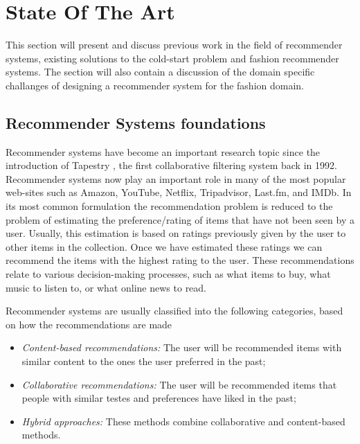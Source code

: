 
\section{State Of The Art}
\label{sec:SotA}

This section will present and discuss previous work in the field of recommender systems, existing solutions to the cold-start problem and fashion recommender systems. The section will also contain a discussion of the domain specific challanges of designing a recommender system for the fashion domain.

\subsection{Recommender Systems foundations}

Recommender systems have become an important research topic since the introduction of Tapestry \cite{Goldberg1992}, the first collaborative filtering system back in 1992. Recommender systems now play an important role in many of the most popular web-sites such as Amazon, YouTube, Netflix, Tripadvisor, Last.fm, and IMDb. In its most common formulation the recommendation problem is reduced to the problem of estimating the preference/rating of items that have not been seen by a user. Usually, this estimation is based on ratings previously given by the user to other items in the collection. Once we have estimated these ratings we can recommend the items with the highest rating to the user. These recommendations relate to various decision-making processes, such as what items to buy, what music to listen to, or what online news to read.

Recommender systems are usually classified into the following categories, based on how the recommendations are made \cite{Adomavicius2005}

\begin{itemize}
\item \emph{Content-based recommendations:} The user will be recommended items with similar content to the ones the user preferred in the past;
\item \emph{Collaborative recommendations:} The user will be recommended items that people with similar testes and preferences have liked in the past;
\item \emph{Hybrid approaches:} These methods combine collaborative and content-based methods.
\end{itemize}

